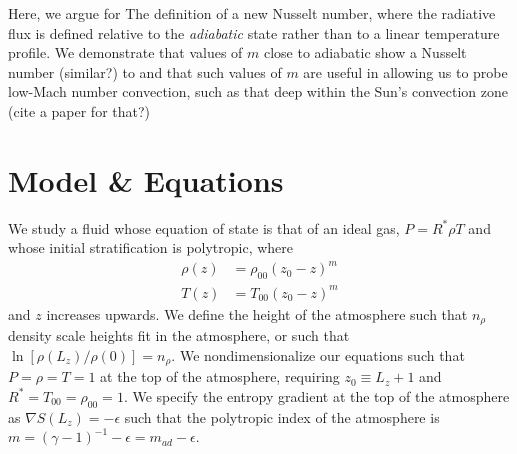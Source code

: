 \documentclass[aps, prl, twocolumn, groupedaddress]{revtex4-1}
\newcommand{\grad}{\ensuremath{\nabla}}
\begin{document}
Here, we argue for The definition of a new Nusselt number, where the radiative flux is defined relative to
the \emph{adiabatic} state rather than to a linear temperature profile.  We demonstrate that values
of $m$ close to adiabatic show a Nusselt number (similar?) to \cite{johnston&doering2009} and that
such values of $m$ are useful in allowing us to probe low-Mach number convection, such as that
deep within the Sun's convection zone (cite a paper for that?)


\section{Model \& Equations \label{section:model}}
We study a fluid whose equation of state is that of an ideal gas, $P = R^*\rho T$ and whose
initial stratification is polytropic, where
\begin{equation}
\begin{split}
\rho(z) &= \rho_{00}(z_0 - z)^m \\
T(z)    &= T_{00}(z_0 - z)^m
\end{split}
\end{equation}
and $z$ increases upwards. We define the height of the atmosphere such that $n_\rho$ density scale heights fit in the
atmosphere, or such that $\ln[\rho(L_{z})/\rho(0)] = n_\rho$.  We nondimensionalize our equations such that 
$P = \rho = T = 1$ at the top of the atmosphere, requiring $z_0 \equiv L_z + 1$ and $R^* = T_{00} = \rho_{00} = 1$.  
We specify the entropy gradient at the top of the atmosphere as $\grad S(L_z) = -\epsilon$ such that the
polytropic index of the atmosphere is $m = (\gamma - 1)^{-1} - \epsilon = m_{ad} - \epsilon$.
\end{document}
